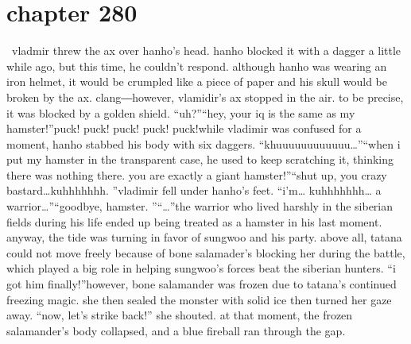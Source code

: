 \section{chapter 280}






 vladmir threw the ax over hanho’s head.
 hanho blocked it with a dagger a little while ago, but this time, he couldn’t respond.
although hanho was wearing an iron helmet, it would be crumpled like a piece of paper and his skull would be broken by the ax.
clang―however, vlamidir’s ax stopped in the air.
 to be precise, it was blocked by a golden shield.
“uh?”“hey, your iq is the same as my hamster!”puck! puck! puck! puck! puck!while vladimir was confused for a moment, hanho stabbed his body with six daggers.
“khuuuuuuuuuuuu…”“when i put my hamster in the transparent case, he used to keep scratching it, thinking there was nothing there.
 you are exactly a giant hamster!”“shut up, you crazy bastard…kuhhhhhhh.
”vladimir fell under hanho’s feet.
“i’m… kuhhhhhhh… a warrior…”“goodbye, hamster.
”“…”the warrior who lived harshly in the siberian fields during his life ended up being treated as a hamster in his last moment.
anyway, the tide was turning in favor of sungwoo and his party.
 above all, tatana could not move freely because of bone salamader’s blocking her during the battle, which played a big role in helping sungwoo’s forces beat the siberian hunters.
“i got him finally!”however, bone salamander was frozen due to tatana’s continued freezing magic.
 she then sealed the monster with solid ice then turned her gaze away.
“now, let’s strike back!” she shouted.
at that moment, the frozen salamander’s body collapsed, and a blue fireball ran through the gap.

